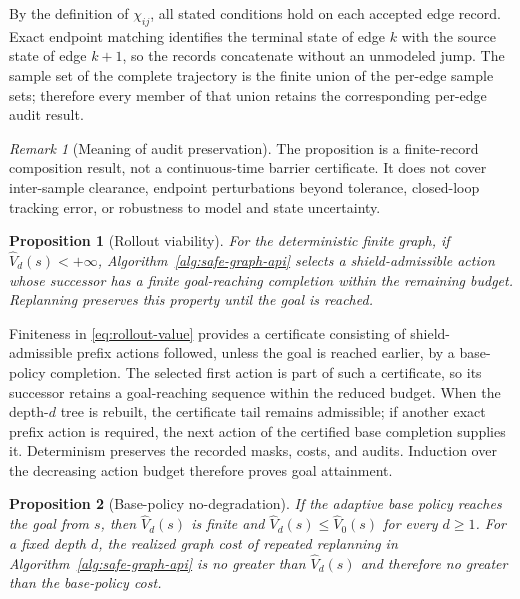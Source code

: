 \documentclass{IEEEtaes}
\newtheorem{proposition}{Proposition}
\theoremstyle{remark}
\newtheorem{remark}{Remark}
\theoremstyle{plain}
\begin{document}
\begin{IEEEproof}
By the definition of $\chi_{ij}$, all stated conditions hold on each accepted edge record. Exact endpoint matching identifies the terminal state of edge $k$ with the source state of edge $k+1$, so the records concatenate without an unmodeled jump. The sample set of the complete trajectory is the finite union of the per-edge sample sets; therefore every member of that union retains the corresponding per-edge audit result.
\end{IEEEproof}

\begin{remark}[Meaning of audit preservation]
The proposition is a finite-record composition result, not a continuous-time barrier certificate. It does not cover inter-sample clearance, endpoint perturbations beyond tolerance, closed-loop tracking error, or robustness to model and state uncertainty.
\end{remark}

\begin{proposition}[Rollout viability]
\label{prop:rollout-viability}
For the deterministic finite graph, if $\widehat V_d(s)<+\infty$, Algorithm~\ref{alg:safe-graph-api} selects a shield-admissible action whose successor has a finite goal-reaching completion within the remaining budget. Replanning preserves this property until the goal is reached.
\end{proposition}

\begin{IEEEproof}
Finiteness in \eqref{eq:rollout-value} provides a certificate consisting of shield-admissible prefix actions followed, unless the goal is reached earlier, by a base-policy completion. The selected first action is part of such a certificate, so its successor retains a goal-reaching sequence within the reduced budget. When the depth-$d$ tree is rebuilt, the certificate tail remains admissible; if another exact prefix action is required, the next action of the certified base completion supplies it. Determinism preserves the recorded masks, costs, and audits. Induction over the decreasing action budget therefore proves goal attainment.
\end{IEEEproof}

\begin{proposition}[Base-policy no-degradation]
\label{prop:base-bound}
If the adaptive base policy reaches the goal from $s$, then $\widehat V_d(s)$ is finite and $\widehat V_d(s)\le\widehat V_0(s)$ for every $d\ge1$. For a fixed depth $d$, the realized graph cost of repeated replanning in Algorithm~\ref{alg:safe-graph-api} is no greater than $\widehat V_d(s)$ and therefore no greater than the base-policy cost.
\end{proposition}
\end{document}
